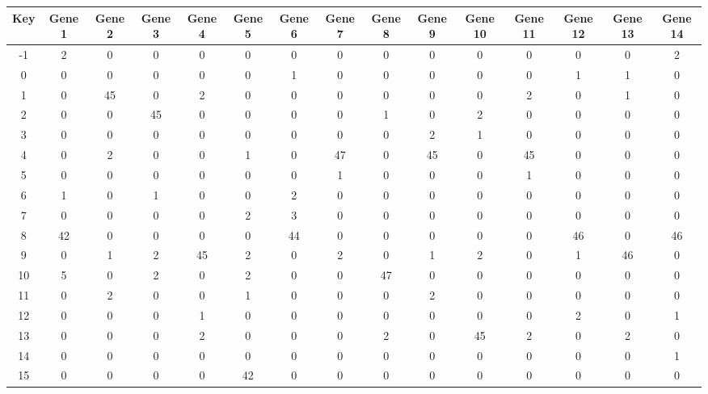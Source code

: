 \begin{tabular}{|c|c|c|c|c|c|c|c|c|c|c|c|c|c|c|}
\hline
Key & Gene 1 & Gene 2 & Gene 3 & Gene 4 & Gene 5 & Gene 6 & Gene 7 & Gene 8 & Gene 9 & Gene 10 & Gene 11 & Gene 12 & Gene 13 & Gene 14 \\
\hline
-1 & 2 & 0 & 0 & 0 & 0 & 0 & 0 & 0 & 0 & 0 & 0 & 0 & 0 & 2 \\
0 & 0 & 0 & 0 & 0 & 0 & 1 & 0 & 0 & 0 & 0 & 0 & 1 & 1 & 0 \\
1 & 0 & 45 & 0 & 2 & 0 & 0 & 0 & 0 & 0 & 0 & 2 & 0 & 1 & 0 \\
2 & 0 & 0 & 45 & 0 & 0 & 0 & 0 & 1 & 0 & 2 & 0 & 0 & 0 & 0 \\
3 & 0 & 0 & 0 & 0 & 0 & 0 & 0 & 0 & 2 & 1 & 0 & 0 & 0 & 0 \\
4 & 0 & 2 & 0 & 0 & 1 & 0 & 47 & 0 & 45 & 0 & 45 & 0 & 0 & 0 \\
5 & 0 & 0 & 0 & 0 & 0 & 0 & 1 & 0 & 0 & 0 & 1 & 0 & 0 & 0 \\
6 & 1 & 0 & 1 & 0 & 0 & 2 & 0 & 0 & 0 & 0 & 0 & 0 & 0 & 0 \\
7 & 0 & 0 & 0 & 0 & 2 & 3 & 0 & 0 & 0 & 0 & 0 & 0 & 0 & 0 \\
8 & 42 & 0 & 0 & 0 & 0 & 44 & 0 & 0 & 0 & 0 & 0 & 46 & 0 & 46 \\
9 & 0 & 1 & 2 & 45 & 2 & 0 & 2 & 0 & 1 & 2 & 0 & 1 & 46 & 0 \\
10 & 5 & 0 & 2 & 0 & 2 & 0 & 0 & 47 & 0 & 0 & 0 & 0 & 0 & 0 \\
11 & 0 & 2 & 0 & 0 & 1 & 0 & 0 & 0 & 2 & 0 & 0 & 0 & 0 & 0 \\
12 & 0 & 0 & 0 & 1 & 0 & 0 & 0 & 0 & 0 & 0 & 0 & 2 & 0 & 1 \\
13 & 0 & 0 & 0 & 2 & 0 & 0 & 0 & 2 & 0 & 45 & 2 & 0 & 2 & 0 \\
14 & 0 & 0 & 0 & 0 & 0 & 0 & 0 & 0 & 0 & 0 & 0 & 0 & 0 & 1 \\
15 & 0 & 0 & 0 & 0 & 42 & 0 & 0 & 0 & 0 & 0 & 0 & 0 & 0 & 0 \\
\hline
\end{tabular}